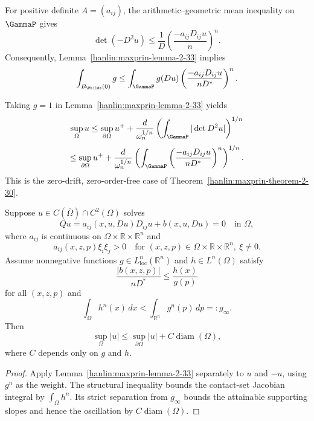 \begin{remark}\label{hanlin:maxprin-remark-2-34}
For positive definite $A=(a_{ij})$, the arithmetic--geometric mean inequality
on $\GammaP$ gives
\[
\det(-D^2u)\le\frac1D
\left(\frac{-a_{ij}D_{ij}u}{n}\right)^n.
\]
Consequently, Lemma~\ref{hanlin:maxprin-lemma-2-33} implies
\[
\int_{B_{\Mtilde}(0)}g
\le\int_{\GammaP}g(Du)
\left(\frac{-a_{ij}D_{ij}u}{nD^*}\right)^n.
\]
\end{remark}

\begin{remark}\label{hanlin:maxprin-remark-2-35}
Taking $g=1$ in Lemma~\ref{hanlin:maxprin-lemma-2-33} yields
\[
\sup_\Omega u\le\sup_{\partial\Omega}u^+
+\frac d{\omega_n^{1/n}}
\left(\int_{\GammaP}|\det D^2u|\right)^{1/n}
\]
\[
\le\sup_{\partial\Omega}u^+
+\frac d{\omega_n^{1/n}}
\left(\int_{\GammaP}
\left(\frac{-a_{ij}D_{ij}u}{nD^*}\right)^n\right)^{1/n}.
\]
This is the zero-drift, zero-order-free case of
Theorem~\ref{hanlin:maxprin-theorem-2-30}.
\end{remark}

\begin{theorem}\label{hanlin:maxprin-theorem-2-36}
Suppose $u\in C(\overline\Omega)\cap C^2(\Omega)$ solves
\[
Qu=a_{ij}(x,u,Du)D_{ij}u+b(x,u,Du)=0
\quad\text{in }\Omega,
\]
where $a_{ij}$ is continuous on
$\Omega\times\mathbb R\times\mathbb R^n$ and
\[
a_{ij}(x,z,p)\xi_i\xi_j>0
\quad\text{for }(x,z,p)\in\Omega\times\mathbb R\times\mathbb R^n,
\ \xi\ne0.
\]
Assume nonnegative functions $g\in L^n_{\mathrm{loc}}(\mathbb R^n)$ and
$h\in L^n(\Omega)$ satisfy
\[
\frac{|b(x,z,p)|}{nD^*}\le\frac{h(x)}{g(p)}
\]
for all $(x,z,p)$ and
\[
\int_\Omega h^n(x)\,dx
<\int_{\mathbb R^n}g^n(p)\,dp=:g_\infty.
\]
Then
\[
\sup_\Omega|u|\le\sup_{\partial\Omega}|u|+C\operatorname{diam}(\Omega),
\]
where $C$ depends only on $g$ and $h$.
\end{theorem}
\begin{proof}
\sketch Apply Lemma~\ref{hanlin:maxprin-lemma-2-33} separately to $u$ and
$-u$, using $g^n$ as the weight. The structural inequality bounds the
contact-set Jacobian integral by $\int_\Omega h^n$. Its strict separation from
$g_\infty$ bounds the attainable supporting slopes and hence the oscillation by
$C\operatorname{diam}(\Omega)$.
\end{proof}

